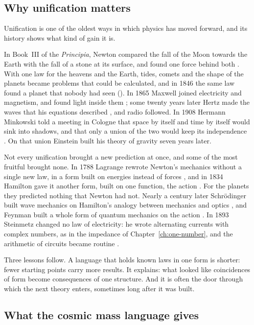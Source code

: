 \subsection{Why unification matters}\label{subsec:al-why}

Unification is one of the oldest ways in which physics has moved forward, and its history shows what kind of gain it is.

In Book~III of the \emph{Principia}, Newton compared the fall of the Moon towards the Earth with the fall of a stone at its surface, and found one force behind both \citep{Newton1687}. With one law for the heavens and the Earth, tides, comets and the shape of the planets became problems that could be calculated, and in 1846 the same law found a planet that nobody had seen (). In 1865 Maxwell joined electricity and magnetism, and found light inside them \citep{Maxwell1865}; some twenty years later Hertz made the waves that his equations described \citep{Hertz1893}, and radio followed. In 1908 Hermann Minkowski told a meeting in Cologne that space by itself and time by itself would sink into shadows, and that only a union of the two would keep its independence \citep{Minkowski1909}. On that union Einstein built his theory of gravity seven years later.

Not every unification brought a new prediction at once, and some of the most fruitful brought none. In 1788 Lagrange rewrote Newton's mechanics without a single new law, in a form built on energies instead of forces \citep{Lagrange1788}, and in 1834 Hamilton gave it another form, built on one function, the action \citep{Hamilton1834}. For the planets they predicted nothing that Newton had not. Nearly a century later Schr{\"o}dinger built wave mechanics on Hamilton's analogy between mechanics and optics \citep{Schrodinger1926}, and Feynman built a whole form of quantum mechanics on the action \citep{Feynman1948}. In 1893 Steinmetz changed no law of electricity: he wrote alternating currents with complex numbers, as in the impedance of Chapter~\ref{ch:one-number}, and the arithmetic of circuits became routine \citep{Steinmetz1893}.

Three lessons follow. A language that holds known laws in one form is shorter: fewer starting points carry more results. It explains: what looked like coincidences of form become consequences of one structure. And it is often the door through which the next theory enters, sometimes long after it was built.

\subsection{What the cosmic mass language gives}\label{subsec:al-value}


